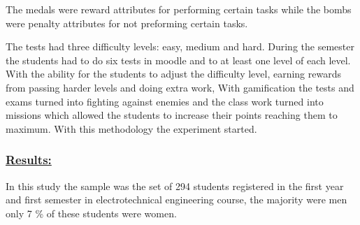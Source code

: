 \documentclass[../main.tex]{subfiles}
\begin{document}
The medals were reward attributes for performing certain tasks while the bombs were penalty attributes for not preforming certain tasks. 

The tests had three difficulty levels: easy, medium and hard. During the semester the students had to do six tests in moodle and to at least one level of each level. With the ability for the students to adjust the difficulty level, earning rewards from passing harder levels and doing extra work, With gamification the tests and exams turned into fighting against enemies and the class work turned into missions which allowed the students to increase their points reaching them to maximum. With this methodology the experiment started.

\subsubsection*{\underline{Results:}}

In this study the sample was the set of 294 students registered in the first year and first semester in electrotechnical engineering course, the majority were men only 7 \% of these students were women. 
\end{document}
